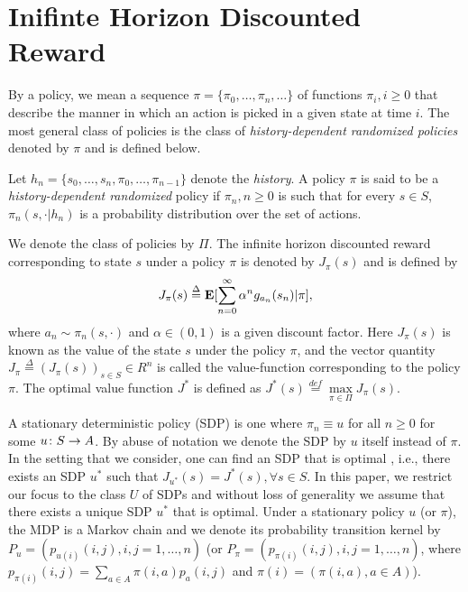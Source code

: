 \section{Inifinte Horizon Discounted Reward}
By a policy, we mean a sequence $\pi=\{\pi_0,\ldots,\pi_n,\ldots\}$ of functions $\pi_i, i\geq 0$ that describe the manner in which an action is picked in a given state at time $i$. The most general class of policies is the class of \emph{history-dependent randomized policies} denoted by $\pi$ and is defined below.
\begin{definition}
Let $h_n=\{s_0,\ldots,s_n, \pi_0, \ldots, \pi_{n-1}\}$ denote the \emph{history}. A policy $\pi$ is said to be a \emph{history-dependent randomized} policy if $\pi_n,n\geq 0$ is such that for every $s\in S$, $\pi_n(s,\cdot|h_n)$ is a probability distribution over the set of actions.
\end{definition}
We denote the class of policies by $\Pi$. The infinite horizon discounted reward corresponding to state $s$ under a policy $\pi$ is denoted by $J_\pi(s)$ and is defined by
\begin{align}
J_\pi(s)\stackrel{\Delta}{=}\mathbf{E}[\sum_{n=0}^\infty \alpha^n g_{a_n}(s_n)|\pi],\nonumber
\end{align}
where $a_{n} \sim \pi_n(s,\cdot)$ and $\alpha \in (0,1)$ is a given discount factor.  Here $J_\pi(s)$ is known as the value of the state $s$ under the policy $\pi$, and the vector quantity $J_\pi\stackrel{\Delta}{=}(J_\pi(s))_{s\in S}\in R^n$ is called the value-function corresponding to the policy $\pi$. The optimal value function $J^*$ is defined as $J^*(s)\stackrel{def}{=}\underset{\pi \in \Pi}{\max} J_\pi(s)$.\par
A stationary deterministic policy (SDP) is one where $\pi_n\equiv u$ for all $n\geq 0$ for some $u\colon S \rightarrow A$. By abuse of notation we denote the SDP by $u$ itself instead of $\pi$. In the setting that we consider, one can find an SDP that is optimal \cite{BertB,Puter}, i.e., there exists an SDP $u^*$ such that $J_{u^*}(s)=J^*(s),\forall s\in S$. In this paper, we restrict our focus to the class $U$ of SDPs and without loss of generality we assume that there exists a unique SDP $u^*$ that is optimal. Under a stationary policy $u$ (or $\pi$), the MDP is a Markov chain and we denote its probability transition kernel by $P_u=(p_{u(i)}(i,j),i,j=1,\ldots,n)$ (or $P_\pi=(p_{\pi(i)}(i,j),i,j=1,\ldots,n)$, where $p_{\pi(i)}(i,j)=\sum_{a\in A}\pi(i,a)p_a(i,j)$ and $\pi(i)=(\pi(i,a), a\in A)$).\par
